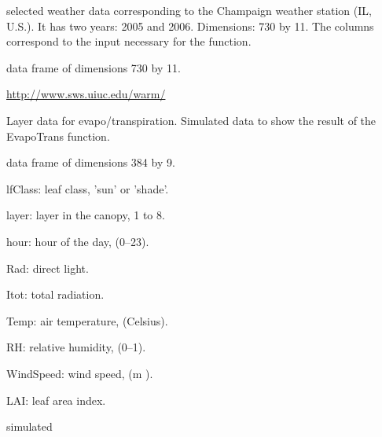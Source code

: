 \documentclass[letterpaper]{book}
\begin{document}
%
\begin{Description}\relax
selected weather data corresponding to the Champaign
weather station (IL, U.S.). It has two years: 2005 and
2006. Dimensions: 730 by 11. The columns correspond to the
input necessary for the  function.
\end{Description}
%
\begin{Format}
data frame of dimensions 730 by 11.
\end{Format}
%
\begin{Source}\relax
\url{http://www.sws.uiuc.edu/warm/}
\end{Source}
%
\begin{Description}\relax
Layer data for evapo/transpiration. Simulated data to show
the result of the EvapoTrans function.
\end{Description}
%
\begin{Format}
data frame of dimensions 384 by 9.
\end{Format}
%
\begin{Details}\relax
lfClass: leaf class, 'sun' or 'shade'.

layer: layer in the canopy, 1 to 8.

hour: hour of the day, (0--23).

Rad: direct light.

Itot: total radiation.

Temp: air temperature, (Celsius).

RH: relative humidity, (0--1).

WindSpeed: wind speed, (m ).

LAI: leaf area index.
\end{Details}
%
\begin{Source}\relax
simulated
\end{Source}
\end{document}
